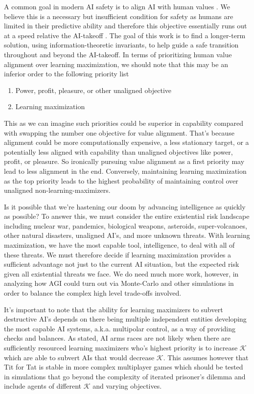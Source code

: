 \documentclass{article}
\begin{document}
A common goal in modern AI safety is to align AI with human values \cite{bostrom-values}. We believe this is a necessary but insufficient condition for safety as humans are limited in their predictive ability and therefore this objective essentially runs out at a speed relative the AI-takeoff \cite{bostrom-takeoff}. The goal of this work is to find a longer-term solution, using information-theoretic invariants, to help guide a safe transition throughout and beyond the AI-takeoff. In terms of prioritizing human value alignment over learning maximization, we should note that this may be an inferior order to the following priority list
\begin{enumerate}
    \item Power, profit, pleasure, or other unaligned objective
    \item Learning maximization
\end{enumerate}
This as we can imagine such priorities could be superior in capability compared with swapping the number one objective for value alignment. That's because alignment could be more computationally expensive, a less stationary target, or a potentially less aligned with capability than unaligned objectives like power, profit, or pleasure. So ironically pursuing value alignment as a first priority may lead to less alignment in the end. Conversely, maintaining learning maximization as the top priority leads to the highest probability of maintaining control over unaligned non-learning-maximizers.

Is it possible that we're hastening our doom by advancing intelligence as quickly as possible?
To answer this, we must consider the entire existential risk landscape including nuclear war\cite{wiki-nuclear-accidents}, pandemics, biological weapons, asteroids, super-volcanoes, other natural disasters, unaligned AI's, and more unknown threats. With learning maximization, we have the most capable tool, intelligence, to deal with all of these threats. We must therefore decide if learning maximization provides a sufficient advantage not just to the current AI situation, but the expected risk given all existential threats we face\cite{wiki-total-expectation}. We do need much more work, however, in analyzing how AGI could turn out via Monte-Carlo \cite{game-of-agi} and other simulations in order to balance the complex high level trade-offs involved.

It's important to note that the ability for learning maximizers to subvert destructive AI's depends on there being multiple independent entities developing the most capable AI systems, a.k.a. multipolar control, as a way of providing checks and balances. As stated, AI arms races are not likely when there are sufficiently resourced learning maximizers who's highest priority is to increase $\mathcal{K}$ which are able to subvert AIs that would decrease $\mathcal{K}$. This assumes however that Tit for Tat\cite{axelrod1988further} is stable in more complex multiplayer games which should be tested in simulations that go beyond the complexity of iterated prisoner's dilemma \cite{fogel1993evolving} and include agents of different $\mathcal{K}$ and varying objectives.
\end{document}
